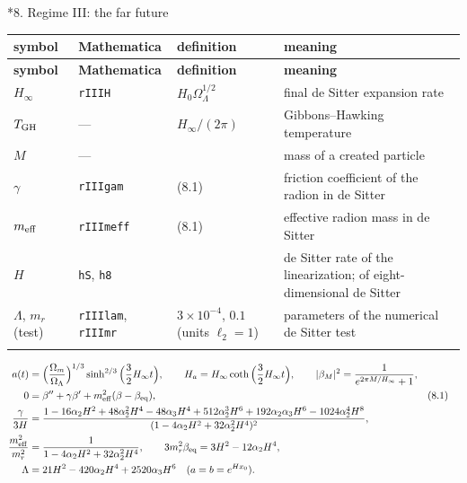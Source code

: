 \documentclass[10pt,a4paper]{article}
\makeatletter
\renewcommand\section{\@startsection{section}{1}{\z@}{-3.5ex \@plus -1ex \@minus -.2ex}{2.3ex \@plus.2ex}{\normalfont\Large\bfseries\raggedright}}
\makeatother
\begin{document}
\section*{8. Regime III: the far future}
{\small
\begin{longtable}{>{\raggedright\arraybackslash}p{}>{\raggedright\arraybackslash}p{}>{\raggedright\arraybackslash}p{}>{\raggedright\arraybackslash}p{}}
\toprule
\textbf{symbol} & \textbf{Mathematica} & \textbf{definition} & \textbf{meaning} \\
\midrule\endfirsthead
\toprule
\textbf{symbol} & \textbf{Mathematica} & \textbf{definition} & \textbf{meaning} \\
\midrule\endhead
\endfoot
\bottomrule\endlastfoot
$H_\infty$ & \texttt{rIIIH} & $H_0\Omega_\Lambda^{1/2}$ & final de Sitter expansion rate \\
$T_{\rm GH}$ & — & $H_\infty/(2\pi)$ & Gibbons–Hawking temperature \\
$M$ & — &  & mass of a created particle \\
$\gamma$ & \texttt{rIIIgam} & (8.1) & friction coefficient of the radion in de Sitter \\
$m_{\rm eff}$ & \texttt{rIIImeff} & (8.1) & effective radion mass in de Sitter \\
$H$ & \texttt{hS}, \texttt{h8} &  & de Sitter rate of the linearization; of eight-dimensional de Sitter \\
$\Lambda$, $m_r$ (test) & \texttt{rIIIlam}, \texttt{rIIImr} & $3\times10^{-4}$, $0.1$ (units $\ell_2=1$) & parameters of the numerical de Sitter test \\*
\end{longtable}}
\begin{align*}
a(t)&=\Big(\frac{\Omega_m}{\Omega_\Lambda}\Big)^{1/3}\sinh^{2/3}\Big(\frac32H_\infty t\Big),\qquad H_a=H_\infty\coth\Big(\frac32H_\infty t\Big),\qquad |\beta_M|^2=\frac1{e^{2\pi M/H_\infty}+1}, \\
0&=\beta''+\gamma\beta'+m_{\rm eff}^2(\beta-\beta_{\rm eq}),&&(8.1) \\
\frac\gamma{3H}&=\frac{1-16\alpha_2H^2+48\alpha_2^2H^4-48\alpha_3H^4+512\alpha_2^3H^6+192\alpha_2\alpha_3H^6-1024\alpha_2^4H^8}{(1-4\alpha_2H^2+32\alpha_2^2H^4)^2}, \\
\frac{m_{\rm eff}^2}{m_r^2}&=\frac1{1-4\alpha_2H^2+32\alpha_2^2H^4},\qquad 3m_r^2\beta_{\rm eq}=3H^2-12\alpha_2H^4, \\
\Lambda&=21H^2-420\alpha_2H^4+2520\alpha_3H^6\quad(a=b=e^{Hx_0}).
\end{align*}
\end{document}
